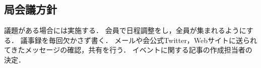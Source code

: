 \subsection*{局会議方針}


議題がある場合には実施する．
会員で日程調整をし，全員が集まれるようにする．
議事録を毎回欠かさず書く．
メールや会公式Twitter，Webサイトに送られてきたメッセージの確認，共有を行う．
イベントに関する記事の作成担当者の決定．